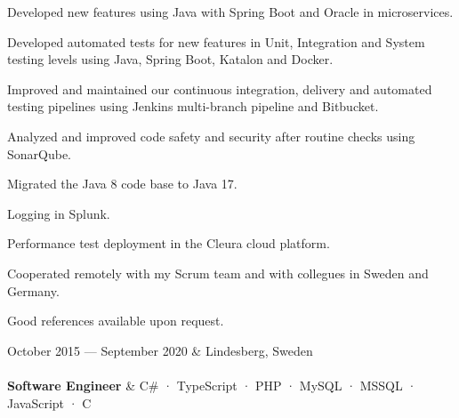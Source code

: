 \documentclass{cv-stylish}
\begin{document}
\begin{center}
\begin{adjustwidth}{0.015\linewidth}{0.015\linewidth}
\begin{compactitem}
  \item Developed new features using Java with Spring Boot and Oracle in
    microservices.
  \item Developed automated tests for new features in Unit, Integration and
    System testing levels using Java, Spring Boot, Katalon and Docker.
  \item Improved and maintained our continuous integration, delivery
    and automated testing pipelines using Jenkins multi-branch
    pipeline and Bitbucket.
  \item Analyzed and improved code safety and security after routine
    checks using SonarQube.
  \item Migrated the Java 8 code base to Java 17.
  \item Logging in Splunk.
  \item Performance test deployment in the Cleura cloud platform.
  \item Cooperated remotely with my Scrum team and with collegues in
    Sweden and Germany.
\end{compactitem}
Good references available upon request.
\end{adjustwidth}

\vspace{1em}
\begin{JobTable}
  October 2015 --- September 2020 & \hfill Lindesberg, Sweden \\[3pt]
   \\[3pt]
  \hspace{5mm} \textbf{Software Engineer}
  & \hfill C\# · TypeScript · PHP · MySQL · MSSQL · JavaScript · C \\
\end{JobTable}
\begin{adjustwidth}{0.015\linewidth}{0.015\linewidth}


\end{adjustwidth}
\end{center}
\end{document}
